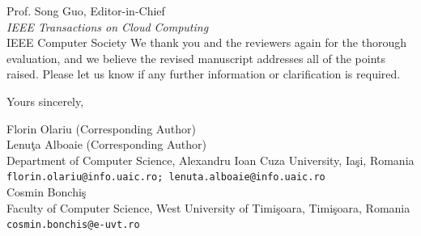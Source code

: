 \documentclass[12pt,a4paper]{letter}
\begin{document}
\begin{letter}{
  Prof. Song Guo, Editor-in-Chief \\
  \textit{IEEE Transactions on Cloud Computing} \\
  IEEE Computer Society
}
\bigskip
We thank you and the reviewers again for the thorough evaluation, and we
believe the revised manuscript addresses all of the points raised. Please
let us know if any further information or clarification is required.

\closing{Yours sincerely,}

\vspace{0.5cm}
Florin Olariu \quad (Corresponding Author) \\
Lenu\c{t}a Alboaie \quad (Corresponding Author) \\[4pt]
Department of Computer Science, Alexandru Ioan Cuza University, Ia\c{s}i, Romania \\[2pt]
\texttt{florin.olariu@info.uaic.ro; lenuta.alboaie@info.uaic.ro} \\[10pt]
Cosmin Bonchi\c{s} \\[4pt]
Faculty of Computer Science, West University of Timi\c{s}oara, Timi\c{s}oara, Romania \\[2pt]
\texttt{cosmin.bonchis@e-uvt.ro}

\end{letter}
\end{document}
